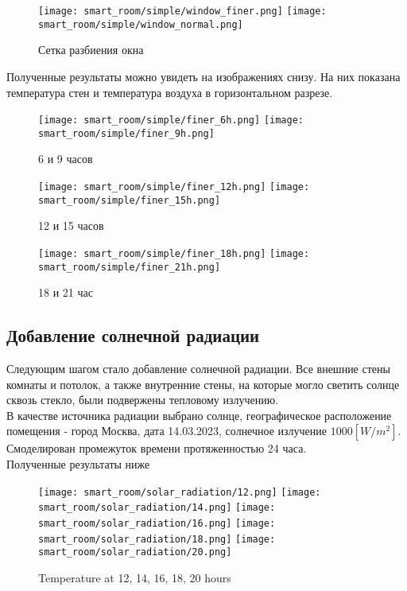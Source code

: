 \begin{figure}[H]
\texttt{[image: smart\_room/simple/window\_finer.png]}\hfill
\texttt{[image: smart\_room/simple/window\_normal.png]}
\caption{Сетка разбиения окна}
\label{window}
\end{figure}


Полученные результаты можно увидеть на изображениях снизу. На них показана температура стен и температура воздуха в горизонтальном разрезе.

\begin{figure}[H]
\texttt{[image: smart\_room/simple/finer\_6h.png]}\hfill
\texttt{[image: smart\_room/simple/finer\_9h.png]}
\caption{6 и 9 часов}
\end{figure}

\begin{figure}[H]
\texttt{[image: smart\_room/simple/finer\_12h.png]}\hfill
\texttt{[image: smart\_room/simple/finer\_15h.png]}
\caption{12 и 15 часов}
\end{figure}

\begin{figure}[H]
\texttt{[image: smart\_room/simple/finer\_18h.png]}\hfill
\texttt{[image: smart\_room/simple/finer\_21h.png]}
\caption{18 и 21 час}
\end{figure}
\newpage


\subsection{Добавление солнечной радиации}

Следующим шагом стало добавление солнечной радиации.
Все внешние стены комнаты и потолок, а также внутренние стены, на которые могло светить солнце сквозь стекло, были подвержены тепловому излучению.\\
В качестве источника радиации выбрано солнце, географическое расположение помещения - город Москва, дата 14.03.2023, солнечное излучение $1000[W/m^2]$.
Смоделирован промежуток времени протяженностью 24 часа.\\
Полученные результаты ниже

\begin{figure}[H]
\texttt{[image: smart\_room/solar\_radiation/12.png]}\hfill
\texttt{[image: smart\_room/solar\_radiation/14.png]}\hfill
\texttt{[image: smart\_room/solar\_radiation/16.png]}\hfill
\texttt{[image: smart\_room/solar\_radiation/18.png]}\hfill
\texttt{[image: smart\_room/solar\_radiation/20.png]}
\caption{Temperature at 12, 14, 16, 18, 20 hours}
\end{figure}

